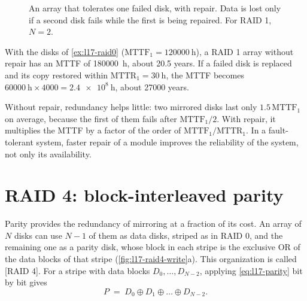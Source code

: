 \documentclass[../main.tex]{subfiles}
\begin{document}
\begin{figure}[htbp]
  \centering
  
  \caption{An array that tolerates one failed disk, with repair.  Data is
    lost only if a second disk fails while the first is being repaired.  For
    RAID 1, $N=2$.}
  \label{fig:l17-raid-repair}
\end{figure}

\begin{example}
  \label{ex:l17-raid1}
  With the disks of \cref{ex:l17-raid0} ($\mathrm{MTTF}_1 = \SI{120000}{\hour}$),%
  a RAID 1 array without repair has an MTTF of \SI{180000}{\hour}, about
  20.5 years.  If a failed disk is replaced and its copy restored within
  $\mathrm{MTTR}_1 = \SI{30}{\hour}$, the MTTF becomes
  $\SI{60000}{\hour} \times 4000 = \SI{2.4e8}{\hour}$, about
  \num{27000} years.
\end{example}

\begin{keypoint}
  Without repair, redundancy helps little: two mirrored disks last only
  $1.5\,\mathrm{MTTF}_1$ on average, because the first of them fails after
  $\mathrm{MTTF}_1/2$.  With
  repair, it multiplies the MTTF by a factor of the order of
  $\mathrm{MTTF}_1/\mathrm{MTTR}_1$.  In a fault-tolerant system, faster
  repair of a module improves the reliability of the system, not only its
  availability.
\end{keypoint}

\section{RAID 4: block-interleaved parity}
\label{sec:l17-raid4}

Parity provides the redundancy of mirroring at a fraction of its
cost.  An array of $N$ disks
can use $N-1$ of them as data disks, striped as in RAID 0, and the remaining
one as a parity disk, whose block in each stripe is the exclusive OR of the
data blocks of that stripe (\cref{fig:l17-raid4-write}a).  This organization
is called [RAID 4].  For a stripe with data blocks
$D_0,\dots,D_{N-2}$, applying \cref{eq:l17-parity} bit by bit gives
\begin{equation}
  P \;=\; D_0 \oplus D_1 \oplus \dots \oplus D_{N-2} .
  \label{eq:l17-raid4-parity}
\end{equation}
\end{document}
